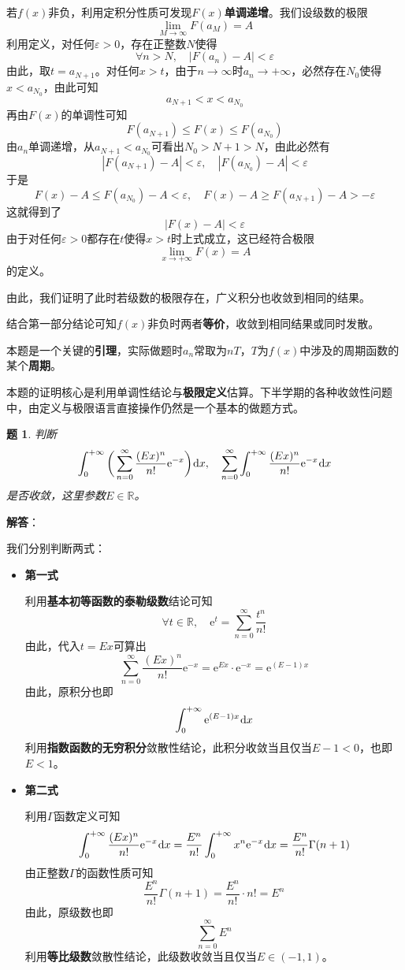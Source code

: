 \documentclass[a4paper,UTF8,fontset=windows,AutoFakeBold]{ctexart}
\newcommand*{\dr}{\hspace{0.07em}\mathrm{d}}
\newcommand*{\er}{\mathrm{e}}
\newcommand*{\rb}{\mathbb{R}}
\newcommand*{\suminf}[1][n=1]{\sum_{#1}^\infty}
\newcommand*{\note}{\noindent *}
\theoremstyle{ex}
\newtheorem{exercise}{题}
\newcommand{\sol}[1]{{\vspace{5pt}\kaishu\noindent\textbf{解答}：\vspace{-3pt}
\begin{compactitem}
    \item[] #1
\end{compactitem}
}}
\begin{document}
\begin{framed}
{\begin{itemize}
        若$f(x)$非负，利用定积分性质可发现$F(x)$\textbf{单调递增}。我们设级数的极限
        $$\lim_{M\to\infty}F(a_M)=A$$
        利用定义，对任何$\varepsilon>0$，存在正整数$N$使得
        $$\forall n>N,\quad|F(a_n)-A|<\varepsilon$$
        由此，取$t=a_{N+1}$。对任何$x>t$，由于$n\to\infty$时$a_n\to+\infty$，必然存在$N_0$使得$x<a_{N_0}$，由此可知
        $$a_{N+1}<x<a_{N_0}$$
        再由$F(x)$的单调性可知
        $$F(a_{N+1})\le F(x)\le F(a_{N_0})$$
        由$a_n$单调递增，从$a_{N+1}<a_{N_0}$可看出$N_0>N+1>N$，由此必然有
        $$|F(a_{N+1})-A|<\varepsilon,\quad|F(a_{N_0})-A|<\varepsilon$$
        于是
        $$F(x)-A\le F(a_{N_0})-A<\varepsilon,\quad F(x)-A\ge F(a_{N+1})-A>-\varepsilon$$
        这就得到了
        $$|F(x)-A|<\varepsilon$$
        由于对任何$\varepsilon>0$都存在$t$使得$x>t$时上式成立，这已经符合极限
        $$\lim_{x\to+\infty}F(x)=A$$
        的定义。

        由此，我们证明了此时若级数的极限存在，广义积分也收敛到相同的结果。
        
        \note 结合第一部分结论可知$f(x)$非负时两者\textbf{等价}，收敛到相同结果或同时发散。
    \end{itemize}
}
\end{framed}

\note 本题是一个关键的\textbf{引理}，实际做题时$a_n$常取为$nT$，$T$为$f(x)$中涉及的周期函数的某个\textbf{周期}。

\note 本题的证明核心是利用单调性结论与\textbf{极限定义}估算。下半学期的各种收敛性问题中，由定义与极限语言直接操作仍然是一个基本的做题方式。

\begin{framed}
\begin{exercise}
    判断
    $$\int_0^{+\infty}\bigg(\suminf[n=0]\frac{(Ex)^n}{n!}\er^{-x}\bigg)\dr x,\quad\suminf[n=0]\int_0^{+\infty}\frac{(Ex)^n}{n!}\er^{-x}\dr x$$
    是否收敛，这里参数$E\in\rb$。
\end{exercise}
\sol{
    我们分别判断两式：
    \begin{itemize}
        \item \textbf{第一式}
        
        利用\textbf{基本初等函数的泰勒级数}结论可知
        $$\forall t\in\rb,\quad\er^t=\suminf[n=0]\frac{t^n}{n!}$$
        由此，代入$t=Ex$可算出
        $$\suminf[n=0]\frac{(Ex)^n}{n!}\er^{-x}=\er^{Ex}\cdot\er^{-x}=\er^{(E-1)x}$$
        由此，原积分也即
        $$\int_0^{+\infty}\er^{(E-1)x}\dr x$$
        利用\textbf{指数函数的无穷积分}敛散性结论，此积分收敛当且仅当$E-1<0$，也即$E<1$。

        \item \textbf{第二式}
        
        利用$\Gamma$函数定义可知
        $$\int_0^{+\infty}\frac{(Ex)^n}{n!}\er^{-x}\dr x=\frac{E^n}{n!}\int_0^{+\infty}x^n\er^{-x}\dr x=\frac{E^n}{n!}\Gamma(n+1)$$
        由正整数$\Gamma$的函数性质可知
        $$\frac{E^n}{n!}\Gamma(n+1)=\frac{E^n}{n!}\cdot n!=E^n$$
        由此，原级数也即
        $$\suminf[n=0]E^n$$
        利用\textbf{等比级数}敛散性结论，此级数收敛当且仅当$E\in(-1,1)$。
    \end{itemize}
}
\end{framed}
\end{document}
